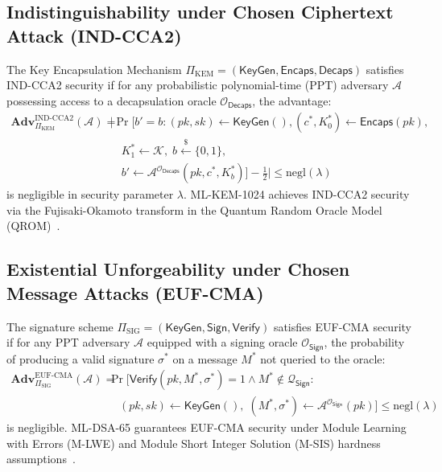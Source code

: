 \subsection{Indistinguishability under Chosen Ciphertext Attack (IND-CCA2)}
The Key Encapsulation Mechanism $\Pi_{\text{KEM}} = (\mathsf{KeyGen}, \mathsf{Encaps}, \mathsf{Decaps})$ satisfies IND-CCA2 security if for any probabilistic polynomial-time (PPT) adversary $\mathcal{A}$ possessing access to a decapsulation oracle $\mathcal{O}_{\mathsf{Decaps}}$, the advantage:
\begin{equation}
\begin{split}
\mathbf{Adv}_{\Pi_{\text{KEM}}}^{\text{IND-CCA2}}(\mathcal{A}) = {} & \Bigg| \Pr\Big[b' = b : (pk, sk) \leftarrow \mathsf{KeyGen}(), (c^*, K_0^*) \leftarrow \mathsf{Encaps}(pk), \\
& \quad K_1^* \leftarrow \mathcal{K}, \; b \stackrel{\$}{\leftarrow} \{0, 1\}, \\
& \quad b' \leftarrow \mathcal{A}^{\mathcal{O}_{\mathsf{Decaps}}}(pk, c^*, K_b^*)\Big] - \frac{1}{2} \Bigg| \le \text{negl}(\lambda)
\end{split}
\end{equation}
is negligible in security parameter $\lambda$. ML-KEM-1024 achieves IND-CCA2 security via the Fujisaki-Okamoto transform in the Quantum Random Oracle Model (QROM)~\cite{kyber2022specs,nist_fips_203}.

\subsection{Existential Unforgeability under Chosen Message Attacks (EUF-CMA)}
The signature scheme $\Pi_{\text{SIG}} = (\mathsf{KeyGen}, \mathsf{Sign}, \mathsf{Verify})$ satisfies EUF-CMA security if for any PPT adversary $\mathcal{A}$ equipped with a signing oracle $\mathcal{O}_{\mathsf{Sign}}$, the probability of producing a valid signature $\sigma^*$ on a message $M^*$ not queried to the oracle:
\begin{equation}
\begin{split}
\mathbf{Adv}_{\Pi_{\text{SIG}}}^{\text{EUF-CMA}}(\mathcal{A}) = {} & \Pr\Big[\mathsf{Verify}(pk, M^*, \sigma^*) = 1 \wedge M^* \notin \mathcal{Q}_{\mathsf{Sign}} : \\
& \quad (pk, sk) \leftarrow \mathsf{KeyGen}(), \; (M^*, \sigma^*) \leftarrow \mathcal{A}^{\mathcal{O}_{\mathsf{Sign}}}(pk) \Big] \le \text{negl}(\lambda)
\end{split}
\end{equation}
is negligible. ML-DSA-65 guarantees EUF-CMA security under Module Learning with Errors (M-LWE) and Module Short Integer Solution (M-SIS) hardness assumptions~\cite{dilithium2022specs,nist_fips_204}.

